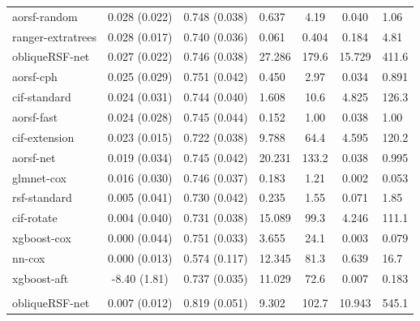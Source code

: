 \documentclass[twoside,11pt]{article}\usepackage[]{graphicx}\usepackage[]{xcolor}
\newenvironment{knitrout}{}{} %
\begin{document}
\begin{knitrout}
\begin{longtable}{lcclccl}
\hline
\hspace{1em}aorsf-random & 0.028 (0.022) & 0.748 (0.038) & 0.637 & 4.19 & 0.040 & 1.06\\
\hspace{1em}ranger-extratrees & 0.028 (0.017) & 0.740 (0.036) & 0.061 & 0.404 & 0.184 & 4.81\\
\hspace{1em}obliqueRSF-net & 0.027 (0.022) & 0.746 (0.038) & 27.286 & 179.6 & 15.729 & 411.6\\
\hspace{1em}aorsf-cph & 0.025 (0.029) & 0.751 (0.042) & 0.450 & 2.97 & 0.034 & 0.891\\
\hspace{1em}cif-standard & 0.024 (0.031) & 0.744 (0.040) & 1.608 & 10.6 & 4.825 & 126.3\\
\hspace{1em}aorsf-fast & 0.024 (0.028) & 0.745 (0.044) & 0.152 & 1.00 & 0.038 & 1.00\\
\hspace{1em}cif-extension & 0.023 (0.015) & 0.722 (0.038) & 9.788 & 64.4 & 4.595 & 120.2\\
\hspace{1em}aorsf-net & 0.019 (0.034) & 0.745 (0.042) & 20.231 & 133.2 & 0.038 & 0.995\\
\hspace{1em}glmnet-cox & 0.016 (0.030) & 0.746 (0.037) & 0.183 & 1.21 & 0.002 & 0.053\\
\hspace{1em}rsf-standard & 0.005 (0.041) & 0.730 (0.042) & 0.235 & 1.55 & 0.071 & 1.85\\
\hspace{1em}cif-rotate & 0.004 (0.040) & 0.731 (0.038) & 15.089 & 99.3 & 4.246 & 111.1\\
\hspace{1em}xgboost-cox & 0.000 (0.044) & 0.751 (0.033) & 3.655 & 24.1 & 0.003 & 0.079\\
\hspace{1em}nn-cox & 0.000 (0.013) & 0.574 (0.117) & 12.345 & 81.3 & 0.639 & 16.7\\
\hspace{1em}xgboost-aft & -8.40 (1.81) & 0.737 (0.035) & 11.029 & 72.6 & 0.007 & 0.183\\
\addlinespace[0.3em]
\hline
\multicolumn{7}{l}{\textit{\textbf{ACTG 320; death, n = 1151, p = 12}}}\\
\hline
\hspace{1em}obliqueRSF-net & 0.007 (0.012) & 0.819 (0.051) & 9.302 & 102.7 & 10.943 & 545.1\\

\end{longtable}
\end{knitrout}
\end{document}

